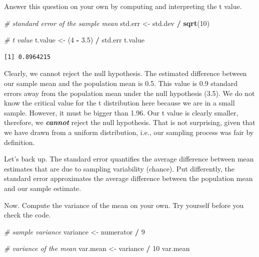 \documentclass[]{article}
\newenvironment{Shaded}{\begin{snugshade}}{\end{snugshade}}
\newcommand{\KeywordTok}[1]{\textcolor[rgb]{0.13,0.29,0.53}{\textbf{#1}}}
\newcommand{\DecValTok}[1]{\textcolor[rgb]{0.00,0.00,0.81}{#1}}
\newcommand{\FloatTok}[1]{\textcolor[rgb]{0.00,0.00,0.81}{#1}}
\newcommand{\StringTok}[1]{\textcolor[rgb]{0.31,0.60,0.02}{#1}}
\newcommand{\CommentTok}[1]{\textcolor[rgb]{0.56,0.35,0.01}{\textit{#1}}}
\newcommand{\OperatorTok}[1]{\textcolor[rgb]{0.81,0.36,0.00}{\textbf{#1}}}
\newcommand{\NormalTok}[1]{#1}
\theoremstyle{definition}
\theoremstyle{definition}
\theoremstyle{definition}
\theoremstyle{remark}
\begin{document}
Answer this question on your own by computing and interpreting the t
value.

\begin{Shaded}
\begin{Highlighting}[]
\CommentTok{# standard error of the sample mean}
\NormalTok{std.err <-}\StringTok{ }\NormalTok{std.dev }\OperatorTok{/}\StringTok{ }\KeywordTok{sqrt}\NormalTok{(}\DecValTok{10}\NormalTok{)}

\CommentTok{# t value}
\NormalTok{t.value <-}\StringTok{ }\NormalTok{(}\DecValTok{4} \OperatorTok{-}\StringTok{ }\FloatTok{3.5}\NormalTok{) }\OperatorTok{/}\StringTok{ }\NormalTok{std.err}
\NormalTok{t.value  }
\end{Highlighting}
\end{Shaded}

\begin{verbatim}
[1] 0.8964215
\end{verbatim}

Clearly, we cannot reject the null hypothesis. The estimated difference
between our sample mean and the population mean is 0.5. This value is
0.9 standard errors away from the population mean under the null
hypothesis (3.5). We do not know the critical value for the t
distribution here because we are in a small sample. However, it must be
bigger than 1.96. Our t value is clearly smaller, therefore, we
\textbf{\emph{cannot}} reject the null hypothesis. That is not
surprising, given that we have drawn from a uniform distribution, i.e.,
our sampling process was fair by definition.

Let's back up. The standard error quantifies the average difference
between mean estimates that are due to sampling variability (chance).
Put differently, the standard error approximates the average difference
between the population mean and our sample estimate.

Now. Compute the variance of the mean on your own. Try yourself before
you check the code.

\begin{Shaded}
\begin{Highlighting}[]
\CommentTok{# sample variance}
\NormalTok{variance <-}\StringTok{ }\NormalTok{numerator }\OperatorTok{/}\StringTok{ }\DecValTok{9}

\CommentTok{# variance of the mean}
\NormalTok{var.mean <-}\StringTok{ }\NormalTok{variance }\OperatorTok{/}\StringTok{ }\DecValTok{10}
\NormalTok{var.mean}
\end{Highlighting}
\end{Shaded}
\end{document}
